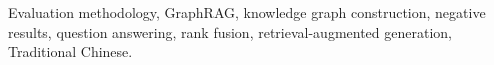 \documentclass[journal]{IEEEtran}
\begin{document}
\begin{IEEEkeywords}
Evaluation methodology, GraphRAG, knowledge graph construction,
negative results, question answering, rank fusion, retrieval-augmented
generation, Traditional Chinese.
\end{IEEEkeywords}

\IEEEpeerreviewmaketitle











\balance

\end{document}
